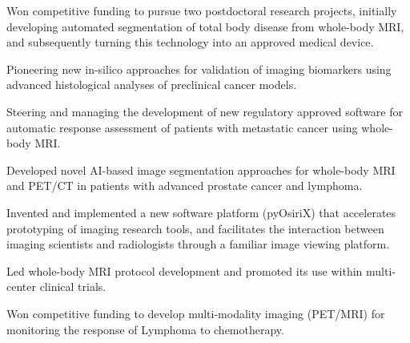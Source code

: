 \documentclass[]{mbcv}
\begin{document}
\begin{minipage}[t]{0.65\textwidth}
\sectionsep

Won competitive funding to pursue two postdoctoral research projects, initially developing automated segmentation of total body disease from whole-body MRI, and subsequently turning this technology into an approved medical device. 

\vspace*{10pt}
\begin{tightemize}
\item Pioneering new in-silico approaches for validation of imaging biomarkers using advanced histological analyses of preclinical cancer models.
\item Steering and managing the development of new regulatory approved software for automatic response assessment of patients with metastatic cancer using whole-body MRI.
\item Developed novel AI-based image segmentation approaches for whole-body MRI and PET/CT in patients with advanced prostate cancer and lymphoma.
\item Invented and implemented a new software platform (pyOsiriX) that accelerates prototyping of imaging research tools, and facilitates the interaction between imaging scientists and radiologists through a familiar image viewing platform.
\item Led whole-body MRI protocol development and promoted its use within multi-center clinical trials. 
\end{tightemize}

\sectionsep

Won competitive funding to develop multi-modality imaging (PET/MRI) for monitoring the response of Lymphoma to chemotherapy.

\sectionsep

\end{minipage}
\end{document}
